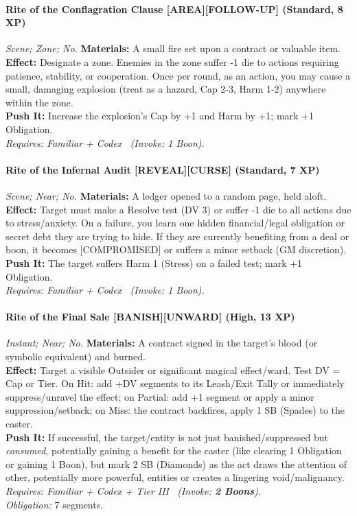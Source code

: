 \paragraph{Rite of the Conflagration Clause \textnormal{[AREA][FOLLOW-UP]} (Standard, 8 XP)} \emph{Scene; Zone; No.}
\textbf{Materials:} A small fire set upon a contract or valuable item.\\
\textbf{Effect:} Designate a zone. Enemies in the zone suffer -1 die to actions requiring patience, stability, or cooperation. Once per round, as an action, you may cause a small, damaging explosion (treat as a hazard, Cap 2-3, Harm 1-2) anywhere within the zone.\\
\textbf{Push It:} Increase the explosion's Cap by +1 and Harm by +1; mark +1 Obligation.\\
\emph{Requires: Familiar + Codex \ (\textit{Invoke:} 1 Boon).}

\paragraph{Rite of the Infernal Audit \textnormal{[REVEAL][CURSE]} (Standard, 7 XP)} \emph{Scene; Near; No.}
\textbf{Materials:} A ledger opened to a random page, held aloft.\\
\textbf{Effect:} Target must make a Resolve test (DV 3) or suffer -1 die to all actions due to stress/anxiety. On a failure, you learn one hidden financial/legal obligation or secret debt they are trying to hide. If they are currently benefiting from a deal or boon, it becomes [COMPROMISED] or suffers a minor setback (GM discretion).\\
\textbf{Push It:} The target suffers Harm 1 (Stress) on a failed test; mark +1 Obligation.\\
\emph{Requires: Familiar + Codex \ (\textit{Invoke:} 1 Boon).}

\paragraph{Rite of the Final Sale \textnormal{[BANISH][UNWARD]} (High, 13 XP)} \emph{Instant; Near; No.}
\textbf{Materials:} A contract signed in the target's blood (or symbolic equivalent) and burned.\\
\textbf{Effect:} Target a visible Outsider or significant magical effect/ward. Test DV = Cap or Tier. On Hit: add +DV segments to its Leash/Exit Tally or immediately suppress/unravel the effect; on Partial: add +1 segment or apply a minor suppression/setback; on Miss: the contract backfires, apply 1 SB (Spades) to the caster.\\
\textbf{Push It:} If successful, the target/entity is not just banished/suppressed but \textit{consumed}, potentially gaining a benefit for the caster (like clearing 1 Obligation or gaining 1 Boon), but mark 2 SB (Diamonds) as the act draws the attention of other, potentially more powerful, entities or creates a lingering void/malignancy.\\
\emph{Requires: Familiar + Codex + Tier III \ (\textit{Invoke:} \textbf{2 Boons}).}\\
\emph{Obligation:} 7 segments.

